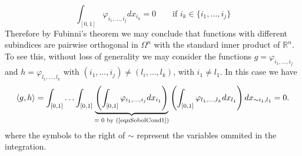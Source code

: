 \documentclass[12pt]{book}
\begin{document}
\begin{equation}\label{eqnSobolCond1}
\int_{[0,1]}\varphi_{i_{1},\ldots,i_{j}}dx_{i_{k}}=0\qquad\text{if }  i_{k}\in \{i_{1},\ldots,i_{j}\}
\end{equation} 
Therefore by Fubinni's theorem \cite{lerner2014course} we may conclude that functions with different subindices are 
 pairwise orthogonal in $\Omega^{n}$ with the standard inner product of $\mathbb{R}^{n}$\cite{bressan1900lecture}. 
To see this, without loss of generality
we may  consider the functions $g=\varphi_{i_{1},\ldots,i_{j}}$ and $h=\varphi_{l_{1},\ldots,l_{k}}$ 
with $(i_{1},\ldots,i_{j})\neq(l_{i},\ldots,l_{k})$, with $i_{1}\neq l_{1}$. In this case we have
\begin{equation*}
\langle g,h\rangle=\int_{[0,1]}\ldots\int_{[0,1]}\underbrace{\left(\int_{[0,1]}\varphi_{i_{1},
\ldots,i_{j}}dx_{i_{1}}\right)}_{\text{$=0$ by (\ref{eqnSobolCond1})}}
\left(\int_{[0,1]}\varphi_{l_{1},\ldots,l_{k}}dx_{l_{1}}\right)dx_{\sim i_{1},l_{1}}=0.
\end{equation*}
where the symbols to the right of $\sim$ represent the variables ommited in the integration.
\end{document}
